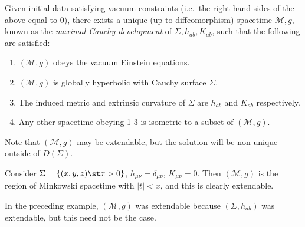 \documentclass{jknotes}
\begin{document}
\begin{theorem}
    Given initial data satisfying vacuum constraints (i.e.\ the right hand sides of the above equal to 0), there exists a unique (up to diffeomorphism) spacetime \(\mathcal{M},g\), known as the \emph{maximal Cauchy development} of \(\Sigma, h_{ab}, K_{ab}\), such that the following are satisfied:
    \begin{enumerate}
        \item \((\mathcal{M},g)\) obeys the vacuum Einstein equations.
        \item \((\mathcal{M},g)\) is globally hyperbolic with Cauchy surface \(\Sigma\).
        \item The induced metric and extrinsic curvature of \(\Sigma\) are \(h_{ab}\) and \(K_{ab}\) respectively.
        \item Any other spacetime obeying 1-3 is isometric to a subset of \((\mathcal{M},g)\).
    \end{enumerate}
\end{theorem}
Note that \((\mathcal{M},g)\) may be extendable, but the solution will be non-unique outside of \(D(\Sigma)\).
\begin{eg}
    Consider \(\Sigma = \{(x,y,z)\st x>0\}\), \(h_{\mu\nu} = \delta_{\mu\nu}\), \(K_{\mu\nu} = 0\). Then \((\mathcal{M},g)\) is the region of Minkowski spacetime with \(|t|<x\), and this is clearly extendable.
\end{eg}
In the preceding example, \((\mathcal{M},g)\) was extendable because \((\Sigma, h_{ab})\) was extendable, but this need not be the case.
\end{document}
